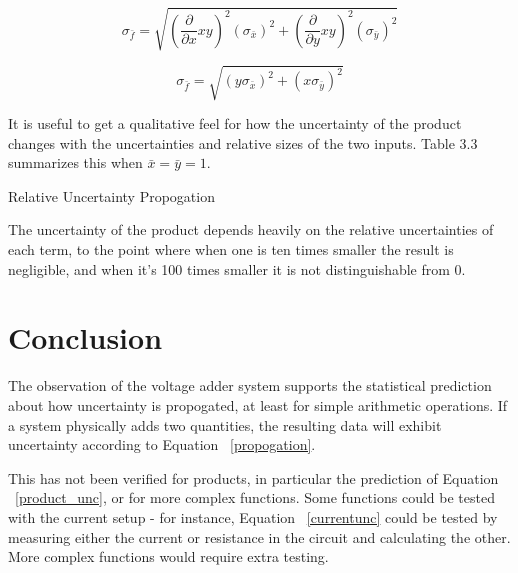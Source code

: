 \documentclass[journal]{IEEEtran}
\begin{document}
\begin{displaymath}
\sigma _{\bar f} = \sqrt{ \left( \frac{\partial}{\partial x} xy  \right)^2
\left( \sigma _{\bar x} \right)^2 + \left( \frac{\partial}{\partial y} xy
\right)^2 \left( \sigma _{\bar y} \right)^2 }
\end{displaymath}

\begin{equation}
\label{product_unc}
\sigma _{\bar f} = \sqrt{ \left( y \sigma _{\bar x} \right)^2 + \left( x
\sigma_{\bar y} \right)^2 }
\end{equation}

It is useful to get a qualitative feel for how the uncertainty of the product
changes with the uncertainties and relative sizes of the two inputs. Table 3.3
summarizes this when $\bar x = \bar y = 1$.

\begin{table}[ht]
\centering
\caption{\normalsize{Relative Uncertainty Propogation}}
\medskip
\caption{Table 3.3: Uncertainty propogation when relative input uncertainty
decreases.}
\end{table}

The uncertainty of the product depends heavily on the relative uncertainties of
each term, to the point where when one is ten times smaller the result is
negligible, and when it's 100 times smaller it is not distinguishable from 0.

\section{Conclusion}

The observation of the voltage adder system supports the statistical prediction
about how uncertainty is propogated, at least for simple arithmetic operations.
If a system physically adds two quantities, the resulting data will exhibit
uncertainty according to Equation ~\ref{propogation}.

This has not been verified for products, in particular the prediction of
Equation ~\ref{product_unc}, or for more complex functions. Some functions
could be tested with the current setup - for instance, Equation
~\ref{currentunc} could be tested by measuring either the current or resistance
in the circuit and calculating the other. More complex functions would require
extra testing.


\ifCLASSOPTIONcaptionsoff
  \newpage
\fi
\end{document}
